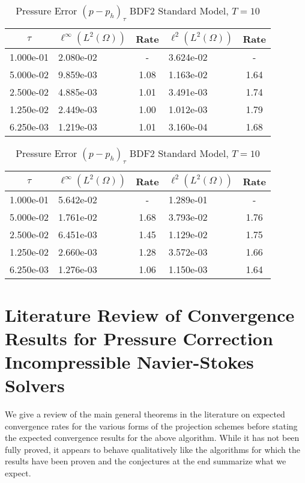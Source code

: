 \documentclass[letterpaper]{erdc}
\begin{document}
\begin{table}[h!]
  \parbox{.45\linewidth}{
  \tiny
  \centering
    \caption{Pressure Error $(p - p_h)_{\tau}$ BDF2 Rotational Model, $T=10$}
    \begin{tabular}{c|l|c|l|c}
      $\tau$ &  $\ell^{\infty}\left(L^2(\Omega)\right)$ &  Rate  &  $\ell^2\left(L^2(\Omega)\right)$  &  Rate\\
      \hline
      1.000e-01 & 2.080e-02 &  -   & 3.624e-02 &  -  \\
      5.000e-02 & 9.859e-03 & 1.08 & 1.163e-02 & 1.64\\
      2.500e-02 & 4.885e-03 & 1.01 & 3.491e-03 & 1.74\\
      1.250e-02 & 2.449e-03 & 1.00 & 1.012e-03 & 1.79\\
      6.250e-03 & 1.219e-03 & 1.01 & 3.160e-04 & 1.68
    \end{tabular}
    }
    \hfill
    \parbox{.45\linewidth}{
    \tiny
    \centering
      \caption{Pressure Error $(p - p_h)_{\tau}$ BDF2 Standard Model, $T=10$}
      \begin{tabular}{c|l|c|l|c}\label{table:lastconvergenceresult}
        $\tau$ &  $\ell^{\infty}\left(L^2(\Omega)\right)$ &  Rate  &  $\ell^2\left(L^2(\Omega)\right)$  &  Rate\\
        \hline
        1.000e-01 & 5.642e-02 &  -   & 1.289e-01 &  -  \\
        5.000e-02 & 1.761e-02 & 1.68 & 3.793e-02 & 1.76\\
        2.500e-02 & 6.451e-03 & 1.45 & 1.129e-02 & 1.75\\
        1.250e-02 & 2.660e-03 & 1.28 & 3.572e-03 & 1.66\\
        6.250e-03 & 1.276e-03 & 1.06 & 1.150e-03 & 1.64
      \end{tabular}
    }
\end{table}




\chapter{Literature Review of Convergence Results for Pressure Correction Incompressible Navier-Stokes Solvers}
We give a review of the main general theorems in the literature on expected convergence rates for the various forms of the projection schemes before stating the expected convergence results for the above algorithm.  While it has not been fully proved, it appears to behave qualitatively like the algorithms for which the results have been proven and the conjectures at the end summarize what we expect.
\end{document}
